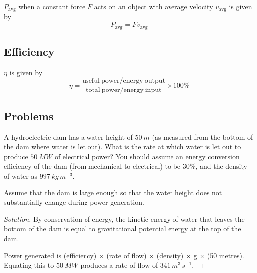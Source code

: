  $P_{\mathrm{avg}}$ when a constant force $F$ acts on an object with average velocity $v_{\mathrm{avg}}$ is given by
\begin{equation} P_{\mathrm{avg}} =  F v_{\mathrm{avg}} \end{equation}

\subsection{Efficiency}
 $\eta$ is given by
\begin{equation} \eta = \frac{\mathrm{useful\:power/energy\:output}}{\mathrm{total\:power/energy\:input}} \times 100\% \end{equation}
\pagebreak

\subsection*{Problems}
\begin{prbm}
A hydroelectric dam has a water height of $50\:\unit{m}$ (as measured from the bottom of the dam where water is let out). What is the rate at which water is let out to produce $50\:\unit{MW}$ of electrical power? You should assume an energy conversion efficiency of the dam (from mechanical to electrical) to be $30\%$, and the density of water as $997\:\unit{kg\,m^{-3}}$.

Assume that the dam is large enough so that the water height does not substantially change during power generation.
\end{prbm}

\begin{proof}[Solution]
By conservation of energy, the kinetic energy of water that leaves the bottom of the dam is equal to gravitational potential energy at the top of the dam.

Power generated is (efficiency) × (rate of flow) × (density) × g × (50 metres). Equating this to $50\:\unit{MW}$ produces a rate of flow of $341\:\unit{m^3\,s^{-1}}$.
\end{proof}
\pagebreak